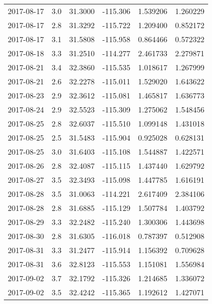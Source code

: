 \begin{tabular}{lrrrrr}
2017-08-17 &       3.0 &  31.3000 &  -115.306 &         1.539206 &         1.260229 \\
2017-08-17 &       2.8 &  31.3292 &  -115.722 &         1.209400 &         0.852172 \\
2017-08-17 &       3.1 &  31.5808 &  -115.958 &         0.864466 &         0.572322 \\
2017-08-18 &       3.3 &  31.2510 &  -114.277 &         2.461733 &         2.279871 \\
2017-08-21 &       3.4 &  32.3860 &  -115.535 &         1.018617 &         1.267999 \\
2017-08-21 &       2.6 &  32.2278 &  -115.011 &         1.529020 &         1.643622 \\
2017-08-23 &       2.9 &  32.3612 &  -115.081 &         1.465817 &         1.636773 \\
2017-08-24 &       2.9 &  32.5523 &  -115.309 &         1.275062 &         1.548456 \\
2017-08-25 &       2.8 &  32.6037 &  -115.510 &         1.099148 &         1.431018 \\
2017-08-25 &       2.5 &  31.5483 &  -115.904 &         0.925028 &         0.628131 \\
2017-08-25 &       3.0 &  31.6403 &  -115.108 &         1.544887 &         1.422571 \\
2017-08-26 &       2.8 &  32.4087 &  -115.115 &         1.437440 &         1.629792 \\
2017-08-27 &       3.5 &  32.3493 &  -115.098 &         1.447785 &         1.616191 \\
2017-08-28 &       3.5 &  31.0063 &  -114.221 &         2.617409 &         2.384106 \\
2017-08-28 &       2.8 &  31.6885 &  -115.129 &         1.507784 &         1.403792 \\
2017-08-29 &       3.3 &  32.2482 &  -115.240 &         1.300306 &         1.443698 \\
2017-08-30 &       2.8 &  31.6305 &  -116.018 &         0.787397 &         0.512908 \\
2017-08-31 &       3.3 &  31.2477 &  -115.914 &         1.156392 &         0.709628 \\
2017-08-31 &       3.6 &  32.8123 &  -115.553 &         1.151081 &         1.556984 \\
2017-09-02 &       3.7 &  32.1792 &  -115.326 &         1.214685 &         1.336072 \\
2017-09-02 &       3.5 &  32.4242 &  -115.365 &         1.192612 &         1.427071 \\

\end{tabular}

